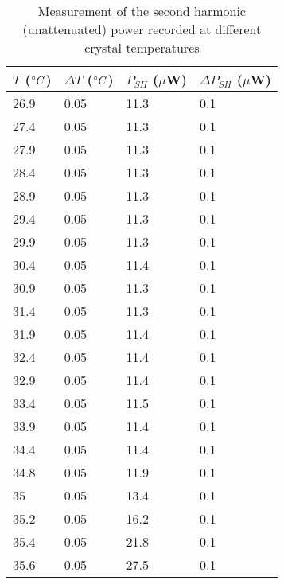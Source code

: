 \begin{table}[]
\centering
\caption{Measurement of the second harmonic (unattenuated) power recorded at different crystal temperatures}
\label{tab:crysttemp}
\begin{tabular}{|l|l|l|l|}
\hline
$T$ ($\degree C$) & $\Delta T$ ($\degree C$) & $P_{SH}$ ($\mu$W) & $\Delta P_{SH}$ ($\mu$W) \\ \hline
26.9            & 0.05       & 11.3        & 0.1       \\ \hline
27.4            & 0.05       & 11.3        & 0.1       \\ \hline
27.9            & 0.05       & 11.3        & 0.1       \\ \hline
28.4            & 0.05       & 11.3        & 0.1       \\ \hline
28.9            & 0.05       & 11.3        & 0.1       \\ \hline
29.4            & 0.05       & 11.3        & 0.1       \\ \hline
29.9            & 0.05       & 11.3        & 0.1       \\ \hline
30.4            & 0.05       & 11.4        & 0.1       \\ \hline
30.9            & 0.05       & 11.3        & 0.1       \\ \hline
31.4            & 0.05       & 11.3        & 0.1       \\ \hline
31.9            & 0.05       & 11.4        & 0.1       \\ \hline
32.4            & 0.05       & 11.4        & 0.1       \\ \hline
32.9            & 0.05       & 11.4        & 0.1       \\ \hline
33.4            & 0.05       & 11.5        & 0.1       \\ \hline
33.9            & 0.05       & 11.4        & 0.1       \\ \hline
34.4            & 0.05       & 11.4        & 0.1       \\ \hline
34.8            & 0.05       & 11.9        & 0.1       \\ \hline
35              & 0.05       & 13.4        & 0.1       \\ \hline
35.2            & 0.05       & 16.2        & 0.1       \\ \hline
35.4            & 0.05       & 21.8        & 0.1       \\ \hline
35.6            & 0.05       & 27.5        & 0.1       \\ \hline

\end{tabular}
\end{table}

